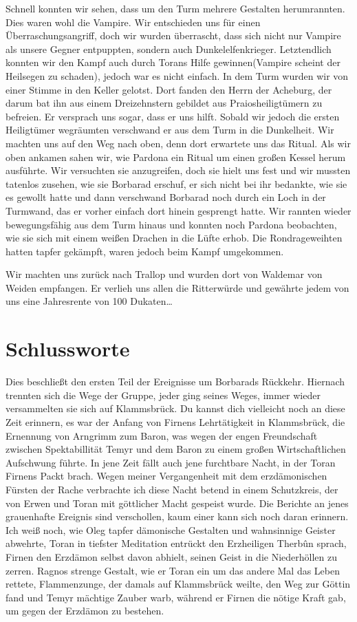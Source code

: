 Schnell konnten wir sehen, dass um den Turm mehrere Gestalten herumrannten. Dies waren wohl die Vampire. Wir entschieden uns für einen Überraschungsangriff, doch wir wurden überrascht, dass sich nicht nur Vampire als unsere Gegner entpuppten, sondern auch Dunkelelfenkrieger. Letztendlich konnten wir den Kampf auch durch Torans Hilfe gewinnen(Vampire scheint der Heilsegen zu schaden), jedoch war es nicht einfach. In dem Turm wurden wir von einer Stimme in den Keller gelotst. Dort fanden den Herrn der Acheburg, der darum bat ihn aus einem Dreizehnstern gebildet aus Praiosheiligtümern zu befreien. Er versprach uns sogar, dass er uns hilft. Sobald wir jedoch die ersten Heiligtümer wegräumten verschwand er aus dem Turm in die Dunkelheit. Wir machten uns auf den Weg nach oben, denn dort erwartete uns das Ritual. Als wir oben ankamen sahen wir, wie Pardona ein Ritual um einen großen Kessel herum ausführte. Wir versuchten sie anzugreifen, doch sie hielt uns fest und wir mussten tatenlos zusehen, wie sie Borbarad erschuf, er sich nicht bei ihr bedankte, wie sie es gewollt hatte und dann verschwand Borbarad noch durch ein Loch in der Turmwand, das er vorher einfach dort hinein gesprengt hatte. Wir rannten wieder bewegungsfähig aus dem Turm hinaus und konnten noch Pardona beobachten, wie sie sich mit einem weißen Drachen in die Lüfte erhob. Die Rondrageweihten hatten tapfer gekämpft, waren jedoch beim Kampf umgekommen.

Wir machten uns zurück nach Trallop und wurden dort von Waldemar von Weiden empfangen. Er verlieh uns allen die Ritterwürde und gewährte jedem von uns eine Jahresrente von 100 Dukaten\dots 



\chapter{Schlussworte}
Dies beschließt den ersten Teil der Ereignisse um Borbarads Rückkehr. Hiernach trennten sich die Wege der Gruppe, jeder ging seines Weges, immer wieder versammelten sie sich auf Klammsbrück. Du kannst dich vielleicht noch an diese Zeit erinnern, es war der Anfang von Firnens Lehrtätigkeit in Klammsbrück, die Ernennung von Arngrimm zum Baron, was wegen der engen Freundschaft zwischen Spektabillität Temyr und dem Baron zu einem großen Wirtschaftlichen Aufschwung führte. In jene Zeit fällt auch jene furchtbare Nacht, in der Toran Firnens Packt brach. Wegen meiner Vergangenheit mit dem erzdämonischen Fürsten der Rache verbrachte ich diese Nacht betend in einem Schutzkreis, der von Erwen und Toran mit göttlicher Macht gespeist wurde. Die Berichte an jenes grauenhafte Ereignis sind verschollen, kaum einer kann sich noch daran erinnern. Ich weiß noch, wie Oleg tapfer dämonische Gestalten und wahnsinnige Geister abwehrte, Toran in tiefster Meditation entrückt den Erzheiligen Therbûn sprach, Firnen den Erzdämon selbst davon abhielt, seinen Geist in die Niederhöllen zu zerren. Ragnos strenge Gestalt, wie er Toran ein um das andere Mal das Leben rettete, Flammenzunge, der damals auf Klammsbrück weilte, den Weg zur Göttin fand und Temyr mächtige Zauber warb, während er Firnen die nötige Kraft gab, um gegen der Erzdämon zu bestehen.

